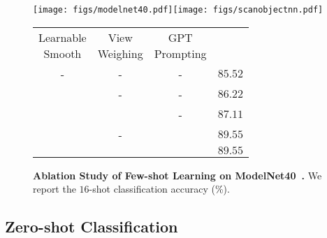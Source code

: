 \documentclass[10pt,twocolumn,letterpaper]{article}
\makeatletter
\newcommand\tabcaption{\def\@captype{table}\caption}
\makeatother
\begin{document}
\begin{figure*}[t]
\vspace{5pt}
\begin{minipage}[c]{0.60\textwidth}
\centering
\hspace{-10pt}
\texttt{[image: figs/modelnet40.pdf]}\hspace{10pt}\texttt{[image: figs/scanobjectnn.pdf]}
\caption{\textbf{Few-shot 3D Classification on ModelNet40~\cite{wu20153d} and ScanObjectNN~\cite{uy2019revisiting}.} We adopt the PB\_T50\_RS split of ScanObjectNN for comparison.}
\label{fig:few_shot_classification}
\end{minipage}\hspace{10pt}
\begin{minipage}[c]{0.33\textwidth}
\vspace{9pt}
\begin{adjustbox}{width=5.9cm}
	\begin{tabular}{cccc}
	\toprule
	\makecell[c]{Learnable\\ Smooth} & \makecell[c]{View\\ Weighing} & \makecell[c]{GPT\\ Prompting} & \makecell[c]{$16$-shot} \\ \cmidrule(lr){1-4}
	- & - & - & $85.52$\\
	\checkmark & - & - & $86.22$\\
	\checkmark & \checkmark & - & $87.11$\\
	\checkmark & - & \checkmark & $89.55$\\ 
	\checkmark & \checkmark & \checkmark & $89.55$ \\ 
	\bottomrule
	\end{tabular}
	\end{adjustbox}
	\vspace{5pt}
    \tabcaption{\textbf{Ablation Study of Few-shot Learning on ModelNet40~\cite{wu20153d}.} We report the $16$-shot classification accuracy (\%). }
\label{table:few_ablation}
\end{minipage}\hspace{17pt}
\end{figure*}

\subsection{Zero-shot Classification}
\label{zero-exp_sec}
\end{document}
